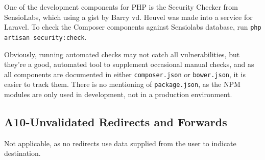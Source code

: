 One of the development components for PHP is the Security
Checker\citep{SecurityCheck2013} from SensioLabs, which using a gist by Barry vd. Heuvel\citep{Gist2013bvh} was made into a service for Laravel. To check the Composer
components against Sensiolabs database, run \texttt{php artisan security:check}.

Obviously, running automated checks may not catch all vulnerabilities, but they're a good, automated tool to supplement occasional manual checks, and as all components are documented in either \texttt{composer.json} or \texttt{bower.json}, it is easier to track them. There is no mentioning of \texttt{package.json}, as the NPM modules are only used in development, not in a production environment.

\subsection{A10-Unvalidated Redirects and Forwards}

Not applicable, as no redirects use data supplied from the user to indicate destination.


